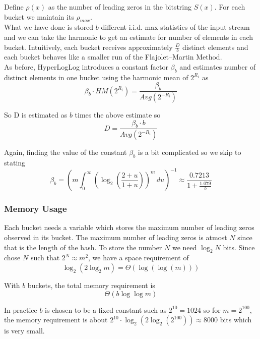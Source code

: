 \noindent Define $\rho(x)$ as the number of leading zeros in the bitstring \(S(x)\). For each 
bucket we maintain its $\rho_{max}$.\\


\noindent What we have done is stored $b$ different i.i.d. max statistics of the input stream and 
we can take the harmonic to get an estimate for number of elements in each bucket. Intuitively, each bucket 
receives approximately $\frac{D}{b}$ distinct elements and each bucket behaves like a 
smaller run of the Flajolet–Martin Method.\\


\noindent 
As before, HyperLogLog introduces a constant factor
\(\beta_b\) and estimates number of distinct elements in one bucket using the harmonic mean of $2^{R_i}$ as
\[
\beta_b \cdot 
HM(2^{R_i})
=
\frac{\beta_b}
{Avg(2^{-R_i})}
\]

So D is estimated as $b$ times the above estimate so
\[
D = \frac{\beta_b \cdot b}
{Avg(2^{-R_i})}
\]


\noindent Again, finding the value of the constant \(\beta_b\) is a bit complicated so we skip to stating
\[
\beta_b
=
\left(
m
\int_0^\infty
\left(
\log_2\!\left(\frac{2+u}{1+u}\right)
\right)^m
\,du
\right)^{-1}
\approx
\frac{0.7213}{1+\frac{1.079}{b}}
\]
\subsubsection*{Memory Usage}

Each bucket needs a variable which stores the maximum number of leading zeros observed in its bucket. 
The maximum number of leading zeros is atmost $N$ since that is the length of the hash. To store the 
number $N$ we need $\log_2 N$ bits. Since chose $N$ such that $2^N \approx m^2$, 
we have a space requirement of 
\[
\log_2(2\log_2 m) = \Theta(\log(\log(m)))
\]


\noindent With \(b\) buckets, the total memory requirement is
\[
\Theta(b\log\log m)
\]

In practice \(b\) is chosen to be a fixed constant such as \(2^{10}=1024\) so for $m=2^{100}$, 
the memory requirement is about $2^{10} \cdot \log_2(2\log_2(2^{100})) \approx 8000$ bits which is very small.
